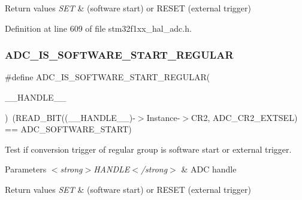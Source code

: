 \begin{DoxyRetVals}{Return values}
{\em S\+ET} & (software start) or R\+E\+S\+ET (external trigger) \\
\hline
\end{DoxyRetVals}


Definition at line 609 of file stm32f1xx\+\_\+hal\+\_\+adc.\+h.

\mbox{\label{group___a_d_c___private___macros_ga2ccb82ecf85d6c6d1ff2cdf9b6a82d2b}} 
\subsubsection{\texorpdfstring{A\+D\+C\+\_\+\+I\+S\+\_\+\+S\+O\+F\+T\+W\+A\+R\+E\+\_\+\+S\+T\+A\+R\+T\+\_\+\+R\+E\+G\+U\+L\+AR}{ADC\_IS\_SOFTWARE\_START\_REGULAR}}
{\footnotesize\ttfamily \#define A\+D\+C\+\_\+\+I\+S\+\_\+\+S\+O\+F\+T\+W\+A\+R\+E\+\_\+\+S\+T\+A\+R\+T\+\_\+\+R\+E\+G\+U\+L\+AR(\begin{DoxyParamCaption}\item[{}]{\+\_\+\+\_\+\+H\+A\+N\+D\+L\+E\+\_\+\+\_\+ }\end{DoxyParamCaption})~(R\+E\+A\+D\+\_\+\+B\+IT((\+\_\+\+\_\+\+H\+A\+N\+D\+L\+E\+\_\+\+\_\+)-\/$>$Instance-\/$>$C\+R2, A\+D\+C\+\_\+\+C\+R2\+\_\+\+E\+X\+T\+S\+EL) == A\+D\+C\+\_\+\+S\+O\+F\+T\+W\+A\+R\+E\+\_\+\+S\+T\+A\+RT)}



Test if conversion trigger of regular group is software start or external trigger. 


\begin{DoxyParams}{Parameters}
{\em $<$strong$>$\+H\+A\+N\+D\+L\+E$<$/strong$>$} & A\+DC handle \\
\hline
\end{DoxyParams}

\begin{DoxyRetVals}{Return values}
{\em S\+ET} & (software start) or R\+E\+S\+ET (external trigger) \\
\hline
\end{DoxyRetVals}


